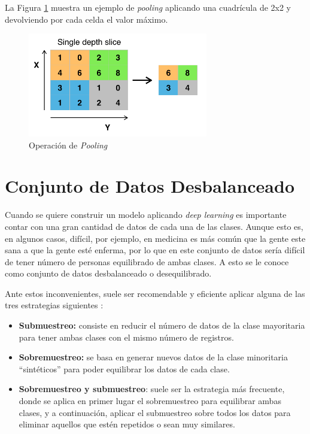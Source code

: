 La Figura \ref{f:pooling} muestra un ejemplo de \emph{pooling} aplicando una cuadrícula de 2x2 y devolviendo por cada celda el valor máximo.

\begin{figure}[h]
 \centering
  \includegraphics[width=0.7\textwidth]{img/pooling.png}
 \caption{Operación de \emph{Pooling} \cite{wiki:pooling}}
 \label{f:pooling}
\end{figure}

\section{Conjunto de Datos Desbalanceado}
Cuando se quiere construir un modelo aplicando \emph{deep learning} es importante contar con una gran cantidad de datos de cada una de las clases. Aunque esto es, en algunos casos, difícil, por ejemplo, en medicina es más común que la gente este sana a que la gente esté enferma, por lo que en este conjunto de datos sería difícil de tener número de personas equilibrado de ambas clases. A esto se le conoce como conjunto de datos desbalanceado o desequilibrado.

Ante estos inconvenientes, suele ser recomendable y eficiente aplicar alguna de las tres estrategias siguientes \cite{Na8_2020}:
\begin{itemize}
    \item \textbf{Submuestreo:} consiste en reducir el número de datos de la clase mayoritaria para tener ambas clases con el mismo número de registros.
    \item \textbf{Sobremuestreo:} se basa en generar nuevos datos de la clase minoritaria \enquote{sintéticos} para poder equilibrar los datos de cada clase.
    \item \textbf{Sobremuestreo y submuestreo}: suele ser la estrategia más frecuente, donde se aplica en primer lugar el sobremuestreo para equilibrar ambas clases, y a continuación, aplicar el submuestreo sobre todos los datos para eliminar aquellos que estén repetidos o sean muy similares.
\end{itemize}


